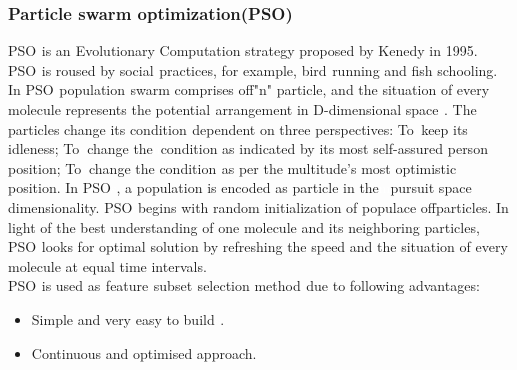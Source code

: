 \documentclass[oneside,12pt]{Classes/VTU}
\begin{document}
    \subsubsection{Particle swarm optimization(PSO)}           
    PSO\tiny\textcolor{white}{s}\normalsize is an\tiny\textcolor{white}{t}\normalsize Evolutionary Computation strategy proposed by Kenedy in 1995. PSO\tiny\textcolor{white}{s}\normalsize is roused by social\tiny\textcolor{white}{s}\normalsize practices, for example, bird\tiny\textcolor{white}{s}\normalsize running and fish schooling. In PSO\tiny\textcolor{white}{s}\normalsize population\tiny\textcolor{white}{s}\normalsize swarm comprises of\tiny\textcolor{white}{f}\normalsize "n" particle, and the situation of every molecule represents the potential\tiny\textcolor{white}{s}\normalsize arrangement in D-dimensional space\tiny\textcolor{white}{s}\normalsize. The particles change its condition\tiny\textcolor{white}{s}\normalsize dependent on three perspectives: To\tiny\textcolor{white}{o}\normalsize keep its idleness; To\tiny\textcolor{white}{o}\normalsize change the\tiny\textcolor{white}{n}\normalsize condition as indicated by its most self-assured person position; To\tiny\textcolor{white}{o}\normalsize change the condition\tiny\textcolor{white}{s}\normalsize as per the multitude's most optimistic position. In PSO\tiny\textcolor{white}{s}\normalsize, a population is encoded as particle in the\tiny\textcolor{white}{m}\normalsize pursuit space dimensionality. PSO\tiny\textcolor{white}{s}\normalsize begins with random initialization of populace of\tiny\textcolor{white}{f}\normalsize particles. In light of the best understanding of one molecule and its neighboring particles, PSO\tiny\textcolor{white}{s}\normalsize looks for optimal solution by refreshing the speed and the situation of every molecule at equal time intervals.
    \\
    PSO\tiny\textcolor{white}{s}\normalsize is used as\tiny\textcolor{white}{s}\normalsize feature\tiny\textcolor{white}{s}\normalsize subset\tiny\textcolor{white}{s}\normalsize selection method\tiny\textcolor{white}{s}\normalsize due to following advantages:
    
    \begin{itemize}
    	\item Simple and very easy to build\tiny\textcolor{white}{s}\normalsize.
    	\item Continuous and optimised approach.
    \end{itemize}
\end{document}
